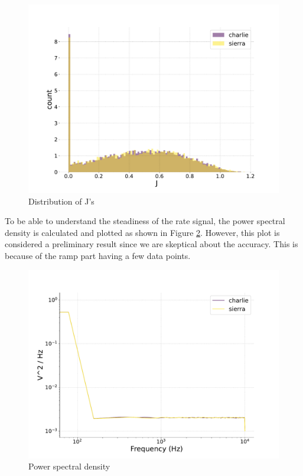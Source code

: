 \documentclass[a4paper,12pt]{article}
\begin{document}
\begin{figure}[htb!] 
    \centering
    \includegraphics[width=\linewidth]{nu_ext_76j_dist.pdf}
    \caption{Distribution of J's}
    \label{charlie76histogram}
\end{figure}
To be able to understand the steadiness of the rate signal, the power spectral density is calculated and plotted as shown in Figure \ref{charlie76PSD}. However, this plot is considered a preliminary result since we are skeptical about the accuracy. This is because of the ramp part having a few data points.  
\begin{figure}[htb!] 
    \centering
    \includegraphics[width=\linewidth]{nu_ext_76PSD_homeostasis.pdf}
    \caption{Power spectral density}
    \label{charlie76PSD}
\end{figure}
\end{document}
